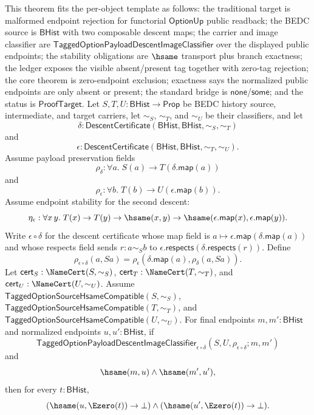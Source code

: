 \begin{theorem}
\label{thm:tagged-option-composite-image-classifier-normalized-zero-endpoint-exclusion}
This theorem fits the per-object template as follows: the traditional target is
malformed endpoint rejection for functorial $\mathsf{OptionUp}$ public readback;
the BEDC source is $\mathsf{BHist}$ with two composable descent maps; the
carrier and image classifier are
$\mathsf{TaggedOptionPayloadDescentImageClassifier}$ over the displayed public
endpoints; the stability obligations are $\hsame$ transport plus branch
exactness; the ledger exposes the visible absent/present tag together with
zero-tag rejection; the core theorem is zero-endpoint exclusion; exactness says
the normalized public endpoints are only absent or present; the standard bridge
is $\mathsf{none}$/$\mathsf{some}$; and the status is $\mathsf{ProofTarget}$.
Let $S,T,U:\mathsf{BHist}\to\mathsf{Prop}$ be BEDC history source,
intermediate, and target carriers, let $\sim_S$, $\sim_T$, and $\sim_U$ be their
classifiers, and let
$$
\delta:\mathsf{DescentCertificate}(\mathsf{BHist},\mathsf{BHist},\sim_S,\sim_T)
$$
and
$$
\epsilon:\mathsf{DescentCertificate}(\mathsf{BHist},\mathsf{BHist},\sim_T,\sim_U).
$$
Assume payload preservation fields
$$
\rho_{\delta}:\forall a.\;S(a)\to T(\delta.\mathsf{map}(a))
$$
and
$$
\rho_{\epsilon}:\forall b.\;T(b)\to U(\epsilon.\mathsf{map}(b)).
$$
Assume endpoint stability for the second descent:
$$
\eta_{\epsilon}:\forall x\,y.\;
T(x)\to T(y)\to \hsame(x,y)\to
\hsame(\epsilon.\mathsf{map}(x),\epsilon.\mathsf{map}(y)).
$$
Write $\epsilon\circ\delta$ for the descent certificate whose map field is
$a\mapsto\epsilon.\mathsf{map}(\delta.\mathsf{map}(a))$ and whose respects field
sends $r:a\sim_S b$ to
$\epsilon.\mathsf{respects}(\delta.\mathsf{respects}(r))$. Define
$$
\rho_{\epsilon\circ\delta}(a,Sa)=
\rho_{\epsilon}(\delta.\mathsf{map}(a),\rho_{\delta}(a,Sa)).
$$
Let $\mathsf{cert}_S:\NameCert(S,\sim_S)$,
$\mathsf{cert}_T:\NameCert(T,\sim_T)$, and
$\mathsf{cert}_U:\NameCert(U,\sim_U)$. Assume
$\mathsf{TaggedOptionSourceHsameCompatible}(S,\sim_S)$,
$\mathsf{TaggedOptionSourceHsameCompatible}(T,\sim_T)$, and
$\mathsf{TaggedOptionSourceHsameCompatible}(U,\sim_U)$. For final endpoints
$m,m':\mathsf{BHist}$ and normalized endpoints $u,u':\mathsf{BHist}$, if
$$
\mathsf{TaggedOptionPayloadDescentImageClassifier}_{\epsilon\circ\delta}
(S,U,\rho_{\epsilon\circ\delta};m,m')
$$
and
$$
\hsame(m,u)\land \hsame(m',u'),
$$
then for every $t:\mathsf{BHist}$,
$$
(\hsame(u,\Ezero(t))\to\bot)\land
(\hsame(u',\Ezero(t))\to\bot).
$$
\end{theorem}
